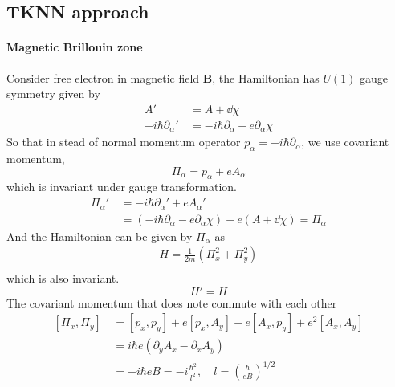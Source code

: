\documentclass[12pt,a4paper]{article}
\begin{document}
\subsection{TKNN approach}

\paragraph{Magnetic Brillouin zone}

    Consider free electron in magnetic field $\mathbf{B}$, the Hamiltonian has $U(1)$ gauge symmetry given by
    \begin{equation}
    \begin{aligned}
        A'
        &\, = A + \dd \chi \\
        -i\hbar \partial_{\alpha}'
        &\, = -i\hbar \partial_{\alpha} - e \partial_{\alpha} \chi
    \end{aligned}
    \end{equation}
    So that in stead of normal momentum operator $p_{\alpha} = -i\hbar \partial_{\alpha}$, we use covariant momentum,
    \begin{equation}
    \label{eq:Pi}
        \Pi_{\alpha} = p_{\alpha} + e A_{\alpha}
    \end{equation}
    which is invariant under gauge transformation.
    \[\begin{aligned}
        \Pi_{\alpha}'
        &\, = -i\hbar \partial_{\alpha}' + e A_{\alpha}' \\
        &\, = \left(-i\hbar \partial_{\alpha} - e \partial_{\alpha} \chi\right)
        + e \left(A + \dd \chi\right)
        = \Pi_{\alpha}
    \end{aligned}\]
    And the Hamiltonian can be given by $\Pi_{\alpha}$ as
    \begin{equation}
    \label{eq:H_MBZ}
    \begin{aligned}
        H = \frac{1}{2m} \left(\Pi_x^2 + \Pi_y^2\right) \\
    \end{aligned}
    \end{equation}
    which is also invariant.
    \[ H' = H \]
    The covariant momentum that does note commute with each other
    \[\begin{aligned}
        \left[\Pi_x, \Pi_y\right]
        &\, = [p_x, p_y] + e [p_x, A_y] + e [A_x, p_y] + e^2 [A_x, A_y] \\
        &\, = i\hbar e \left(\partial_y A_x - \partial_x A_y\right) \\
        &\, = -i\hbar e B
        = -i\frac{\hbar^2}{l^2}, \quad
        l = \left(\frac{\hbar}{eB}\right)^{1/2}
    \end{aligned}\]
\end{document}
